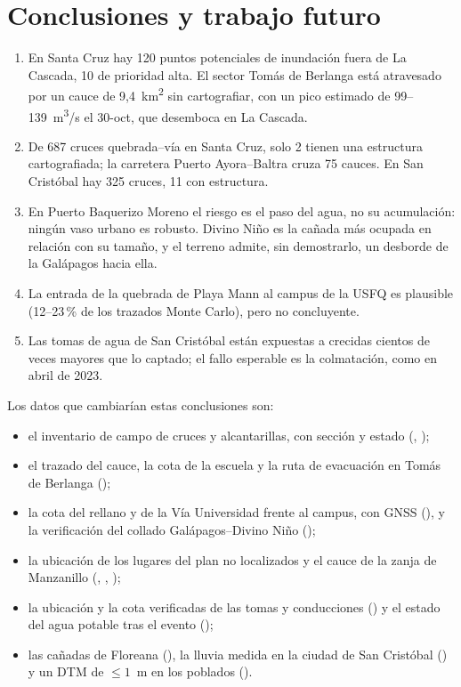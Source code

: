 \documentclass{sosg-informe}
\newcommand{\kmc}{km\textsuperscript{2}}
\newcommand{\mcs}{m\textsuperscript{3}/s}
\begin{document}
\section{Conclusiones y trabajo futuro}
\begin{enumerate}
  \item En Santa Cruz hay 120 puntos potenciales de inundación fuera de La Cascada, 10 de prioridad alta. El sector Tomás de Berlanga está atravesado por un cauce de 9,4~\kmc{} sin cartografiar, con un pico estimado de 99--139~\mcs{} el 30-oct, que desemboca en La Cascada.
  \item De 687 cruces quebrada--vía en Santa Cruz, solo 2 tienen una estructura cartografiada; la carretera Puerto Ayora--Baltra cruza 75 cauces. En San Cristóbal hay 325 cruces, 11 con estructura.
  \item En Puerto Baquerizo Moreno el riesgo es el paso del agua, no su acumulación: ningún vaso urbano es robusto. Divino Niño es la cañada más ocupada en relación con su tamaño, y el terreno admite, sin demostrarlo, un desborde de la Galápagos hacia ella.
  \item La entrada de la quebrada de Playa Mann al campus de la USFQ es plausible (12--23\,\% de los trazados Monte Carlo), pero no concluyente.
  \item Las tomas de agua de San Cristóbal están expuestas a crecidas cientos de veces mayores que lo captado; el fallo esperable es la colmatación, como en abril de 2023.
\end{enumerate}

Los datos que cambiarían estas conclusiones son:
\begin{itemize}
  \item el inventario de campo de cruces y alcantarillas, con sección y estado (, );
  \item el trazado del cauce, la cota de la escuela y la ruta de evacuación en Tomás de Berlanga ();
  \item la cota del rellano y de la Vía Universidad frente al campus, con GNSS (), y la verificación del collado Galápagos--Divino Niño ();
  \item la ubicación de los lugares del plan no localizados y el cauce de la zanja de Manzanillo (, , );
  \item la ubicación y la cota verificadas de las tomas y conducciones () y el estado del agua potable tras el evento ();
  \item las cañadas de Floreana (), la lluvia medida en la ciudad de San Cristóbal () y un DTM de $\leq 1$~m en los poblados ().
\end{itemize}
\end{document}
